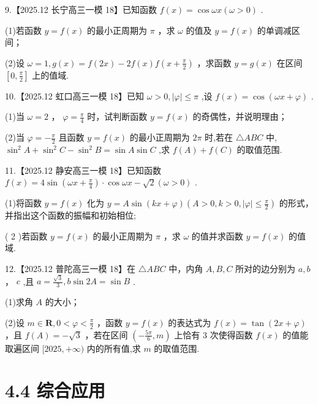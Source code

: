 \documentclass[10pt]{article}
\begin{document}
9.【2025.12 长宁高三一模 18】已知函数 \(f\left( x\right)  = \cos {\omega x}\left( {\omega  > 0}\right)\) .

(1)若函数 \(y = f\left( x\right)\) 的最小正周期为 \(\pi\) ，求 \(\omega\) 的值及 \(y = f\left( x\right)\) 的单调减区间；

(2)设 \(\omega  = 1,g\left( x\right)  = f\left( {2x}\right)  - {2f}\left( x\right) f\left( {x + \frac{\pi }{2}}\right)\) ，求函数 \(y = g\left( x\right)\) 在区间 \(\left\lbrack  {0,\frac{\pi }{2}}\right\rbrack\) 上的值域.

10.【2025.12 虹口高三一模 18】已知 \(\omega  > 0,\left| \varphi \right|  \leq  \pi\) ,设 \(f\left( x\right)  = \cos \left( {{\omega x} + \varphi }\right)\) .

(1)当 \(\omega  = 2\) ， \(\varphi  = \frac{\pi }{4}\) 时，试判断函数 \(y = f\left( x\right)\) 的奇偶性，并说明理由；

(2)当 \(\varphi  =  - \frac{\pi }{2}\) 且函数 \(y = f\left( x\right)\) 的最小正周期为 \({2\pi }\) 时,若在 \(\bigtriangleup {ABC}\) 中, \({\sin }^{2}A + {\sin }^{2}C - {\sin }^{2}B = \sin A\sin C\) ,求 \(f\left( A\right)  + f\left( C\right)\) 的取值范围.

11.【2025.12 静安高三一模 18】已知函数 \(f\left( x\right)  = 4\sin \left( {{\omega x} + \frac{\pi }{4}}\right)  \cdot  \cos {\omega x} - \sqrt{2}\left( {\omega  > 0}\right)\) .

(1)将函数 \(y = f\left( x\right)\) 化为 \(y = A\sin \left( {{kx} + \varphi }\right) \left( {A > 0,k > 0,\left| \varphi \right|  \leq  \frac{\pi }{2}}\right)\) 的形式，并指出这个函数的振幅和初始相位;

( 2 )若函数 \(y = f\left( x\right)\) 的最小正周期为 \(\pi\) ，求 \(\omega\) 的值并求函数 \(y = f\left( x\right)\) 的值域.

12.【2025.12 普陀高三一模 18】在 \(\bigtriangleup {ABC}\) 中，内角 \(A,B,C\) 所对的边分别为 \(a,b\) ， \(c\) ,且 \(a = \frac{\sqrt{3}}{3},b\sin {2A} = \sin B\) .

(1)求角 \(A\) 的大小；

(2)设 \(m \in  \mathbf{R},0 < \varphi  < \frac{\pi }{2}\) ，函数 \(y = f\left( x\right)\) 的表达式为 \(f\left( x\right)  = \tan \left( {{2x} + \varphi }\right)\) ，且 \(f\left( A\right)  =  - \sqrt{3}\) ，若在区间 \(\left( {-\frac{5\pi }{6},m}\right)\) 上恰有 3 次使得函数 \(f\left( x\right)\) 的值能取遍区间 \(\lbrack {2025}, + \infty )\) 内的所有值,求 \(m\) 的取值范围.

\section*{4.4 综合应用}
\end{document}
